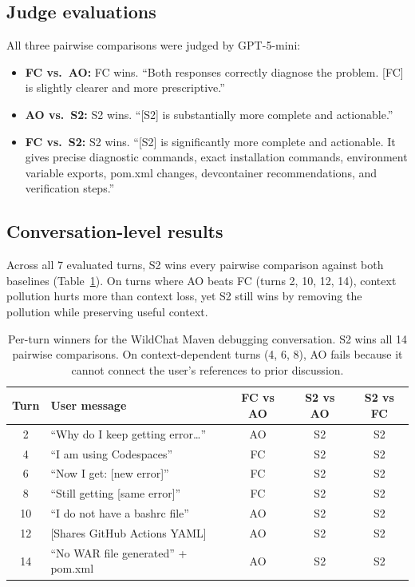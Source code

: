 \documentclass{article}
\begin{document}
\subsection{Judge evaluations}

All three pairwise comparisons were judged by GPT-5-mini:

\begin{itemize}
    \item \textbf{FC vs.\ AO:} FC wins. ``Both responses correctly diagnose the problem. [FC] is slightly clearer and more prescriptive.''
    \item \textbf{AO vs.\ S2:} S2 wins. ``[S2] is substantially more complete and actionable.''
    \item \textbf{FC vs.\ S2:} S2 wins. ``[S2] is significantly more complete and actionable. It gives precise diagnostic commands, exact installation commands, environment variable exports, pom.xml changes, devcontainer recommendations, and verification steps.''
\end{itemize}

\subsection{Conversation-level results}

Across all 7 evaluated turns, S2 wins every pairwise comparison against both baselines (Table~\ref{tab:traj-turns}). On turns where AO beats FC (turns 2, 10, 12, 14), context pollution hurts more than context loss, yet S2 still wins by removing the pollution while preserving useful context.

\begin{table}[h]
\centering
\begin{tabular}{clccc}
\toprule
\textbf{Turn} & \textbf{User message} & \textbf{FC vs AO} & \textbf{S2 vs AO} & \textbf{S2 vs FC} \\
\midrule
2 & ``Why do I keep getting error\ldots'' & AO & S2 & S2 \\
4 & ``I am using Codespaces'' & FC & S2 & S2 \\
6 & ``Now I get: [new error]'' & FC & S2 & S2 \\
8 & ``Still getting [same error]'' & FC & S2 & S2 \\
10 & ``I do not have a bashrc file'' & AO & S2 & S2 \\
12 & [Shares GitHub Actions YAML] & AO & S2 & S2 \\
14 & ``No WAR file generated'' + pom.xml & AO & S2 & S2 \\
\bottomrule
\end{tabular}
\caption{Per-turn winners for the WildChat Maven debugging conversation. S2 wins all 14 pairwise comparisons. On context-dependent turns (4, 6, 8), AO fails because it cannot connect the user's references to prior discussion.}
\label{tab:traj-turns}
\end{table}
\end{document}
